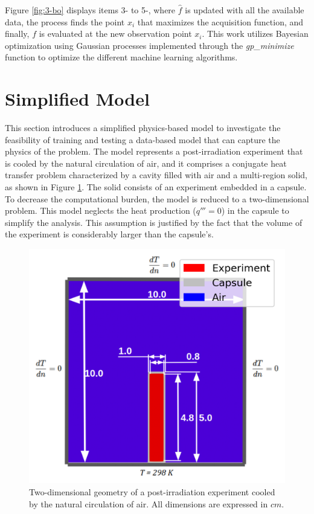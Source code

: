 Figure \ref{fig:3-bo} displays items 3- to 5-, where $\hat{f}$ is updated with all the available data, the process finds the point $x_i$ that maximizes the acquisition function, and finally, $f$ is evaluated at the new observation point $x_i$. 
This work utilizes Bayesian optimization using Gaussian processes implemented through the \textit{gp\_minimize} function \cite{scikit_optimize} to optimize the different machine learning algorithms.


\section{Simplified Model}
\label{sec:simpl-model}

This section introduces a simplified physics-based model to investigate the feasibility of training and testing a data-based model that can capture the physics of the problem.
The model represents a post-irradiation experiment that is cooled by the natural circulation of air, and it comprises a conjugate heat transfer problem characterized by a cavity filled with air and a multi-region solid, as shown in Figure \ref{fig:tf-geo}.
The solid consists of an experiment embedded in a capsule.
To decrease the computational burden, the model is reduced to a two-dimensional problem.
This model neglects the heat production ($q''' = 0$) in the capsule to simplify the analysis.
This assumption is justified by the fact that the volume of the experiment is considerably larger than the capsule's.

\begin{figure}[htbp!] %
    \centering
    \includegraphics[width=0.5\linewidth]{figures/tf-geo-simple2}
    \hfill
    \caption{Two-dimensional geometry of a post-irradiation experiment cooled by the natural circulation of air. All dimensions are expressed in $cm$.}
    \label{fig:tf-geo}
\end{figure}

